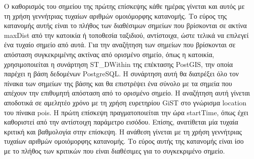 Ο καθορισμός του σημείου της πρώτης επίσκεψης κάθε ημέρας γίνεται και αυτός με τη χρήση γεννήτριας τυχαίων αριθμών ομοιόμορφης κατανομής. Το εύρος της κατανομής αυτής 
είναι το πλήθος των διαθέσιμων σημείων που βρίσκονται σε ακτίνα maxDist από την κατοικία ή τοποθεσία ταξιδιού, αντίστοιχα, ώστε τελικά να επιλεγεί ένα τυχαίο 
σημείο από αυτά. Για την αναζήτηση των σημείων που βρίσκονται σε απόσταση συγκεκριμένης ακτίνας από ορισμένο σημείο, όπως η κατοικία, χρησιμοποιείται η 
συνάρτηση ST\_DWithin της επέκτασης PostGIS, την οποία παρέχει η βάση δεδομένων PostgreSQL. Η συνάρτηση αυτή θα διατρέξει όλο τον πίνακα των σημείων της βάσης 
και θα επιστρέψει ένα σύνολο με τα σημεία που απέχουν την επιθυμητή απόσταση από το ορισμένο σημείο. Η αναζήτηση αυτή γίνεται αποδοτικά σε αμελητέο χρόνο με τη 
χρήση ευρετηρίου GiST στο γνώρισμα location του πίνακα pois. Η πρώτη επίσκεψη πραγματοποιείται την ώρα startTime, όπως έχει καθοριστεί από την αντίστοιχη 
παράμετρο εισόδου. Επίσης, ανατίθεται μία τυχαία κριτική και βαθμολογία στην επίσκεψη. Η ανάθεση γίνεται με τη χρήση γεννήτριας τυχαίων αριθμών 
ομοιόμορφης κατανομής. Το εύρος αυτής της κατανομής είναι ίσο με το πλήθος των κριτικών που είναι διαθέσιμες για το συγκεκριμένο σημείο. 








